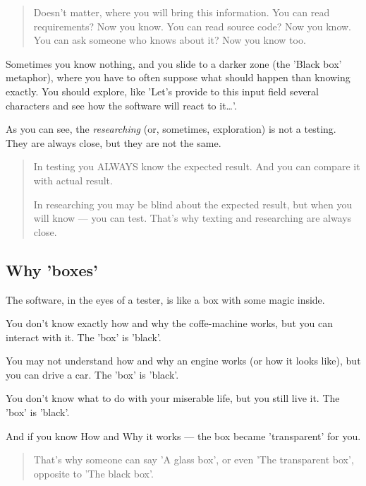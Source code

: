 \begin{quote}
Doesn't matter, where you will bring this information. You can read requirements? Now you know. You can read source code? Now you know. You can ask someone who knows about it? Now you know too. 
\end{quote} 

Sometimes you know nothing, and you slide to a darker zone (the 'Black box' metaphor), where you have to often suppose what should happen than knowing exactly. You should explore, like 'Let's provide to this input field several characters and see how the software will react to it\ldots'.

As you can see, the \emph{researching} (or, sometimes, exploration) is not a testing. They are always close, but they are not the same.

\begin{quote}
In testing you ALWAYS know the expected result. And you can compare it with actual result.

In researching you may be blind about the expected result, but when you will know —  you can test. That's why texting and researching are always close.
\end{quote} 

\subsection{Why 'boxes'}

The software, in the eyes of a tester, is like a box with some magic inside.

You don't know exactly how and why the coffe-machine works, but you can interact with it. The 'box' is 'black'.

You may not understand how and why an engine works (or how it looks like), but you can drive a car. The 'box' is 'black'.

You don't know what to do with your miserable life, but you still live it. The 'box' is 'black'.

And if you know How and Why it works — the box became 'transparent' for you.

\begin{quote}
That's why someone can say 'A glass box', or even 'The transparent box', opposite to 'The black box'.                                                                                                                                                                                       \end{quote} 

